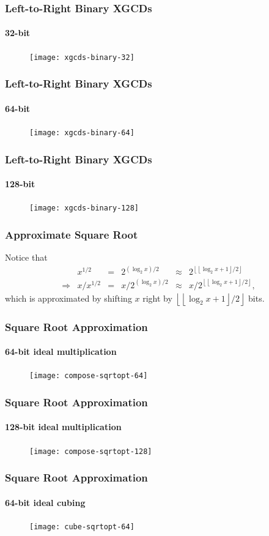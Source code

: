 \documentclass{beamer}
\newcommand{\floor}[1]{\left\lfloor #1 \right\rfloor}
\begin{document}
\begin{frame}
\frametitle{Left-to-Right Binary XGCDs}
\framesubtitle{32-bit}
\begin{figure}
\texttt{[image: xgcds-binary-32]}
\end{figure}
\end{frame}
\begin{frame}
\frametitle{Left-to-Right Binary XGCDs}
\framesubtitle{64-bit}
\begin{figure}
\texttt{[image: xgcds-binary-64]}
\end{figure}
\end{frame}
\begin{frame}
\frametitle{Left-to-Right Binary XGCDs}
\framesubtitle{128-bit}
\begin{figure}
\texttt{[image: xgcds-binary-128]}
\end{figure}
\end{frame}




\begin{frame}
\frametitle{Approximate Square Root}
Notice that
\begin{equation*}
\begin{array}{rrlrlr}
	& x^{1/2} &=& 2^{(\log_2x)/2} &\approx& 2^{\floor{\floor{\log_2x+1}/2}} \\
	\Rightarrow & x / x^{1/2} &=& x / 2^{(\log_2x)/2} &\approx& x / 2^{\floor{\floor{\log_2x+1}/2}},
\end{array}
\end{equation*}
which is approximated by shifting $x$ right by $\floor{\floor{\log_2x+1}/2}$ bits.
\end{frame}

\begin{frame}
\frametitle{Square Root Approximation}
\framesubtitle{64-bit ideal multiplication}
\begin{figure}
\texttt{[image: compose-sqrtopt-64]}
\end{figure}
\end{frame}

\begin{frame}
\frametitle{Square Root Approximation}
\framesubtitle{128-bit ideal multiplication}
\begin{figure}
\texttt{[image: compose-sqrtopt-128]}
\end{figure}
\end{frame}

\begin{frame}
\frametitle{Square Root Approximation}
\framesubtitle{64-bit ideal cubing}
\begin{figure}
\texttt{[image: cube-sqrtopt-64]}
\end{figure}
\end{frame}
\end{document}
